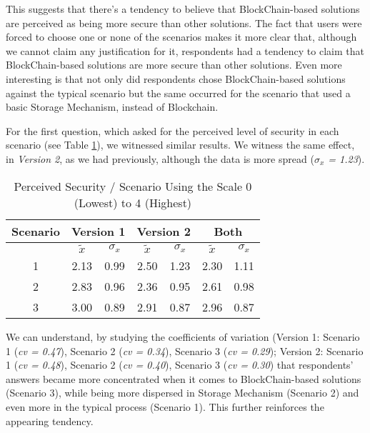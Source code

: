 This suggests that there's a tendency to believe that BlockChain-based solutions are perceived as being more secure than other solutions. The fact that users were forced to choose one or none of the scenarios makes it more clear that, although we cannot claim any justification for it, respondents had a tendency to claim that BlockChain-based solutions are more secure than other solutions. Even more interesting is that not only did respondents chose BlockChain-based solutions against the typical scenario but the same occurred for the scenario that used a basic Storage Mechanism, instead of Blockchain.

For the first question, which asked for the perceived level of security in each scenario (see Table \ref{tab: perceivedSecurity}), we witnessed similar results. We witness the same effect, in \textit{Version 2}, as we had previously, although the data is more spread (\textit{$\sigma_{x}$ = 1.23}).

\begin{table}[htb]
    \centering
    \caption{Perceived Security / Scenario Using the Scale 0 (Lowest) to 4 (Highest)}
    \label{tab: perceivedSecurity}
    \begin{tabular}{c|cccc|cc}
    \hline 
    Scenario & \multicolumn{2}{c}{\bf Version 1} & \multicolumn{2}{c}{\bf Version 2} \vrule & \multicolumn{2}{c}{\bf Both} \\
    \hline
     & $\tilde{x}$ & $\sigma_{x}$ & $\tilde{x}$ & $\sigma_{x}$ & $\tilde{x}$ & $\sigma_{x}$ \\
    \hline
    1 & 2.13 & 0.99 & 2.50 & 1.23 & 2.30 & 1.11 \\
    2 & 2.83 & 0.96 & 2.36 & 0.95 & 2.61 & 0.98 \\
    3 & 3.00 & 0.89 & 2.91 & 0.87 & 2.96 & 0.87 \\
    \hline
    \end{tabular}
\end{table}

We can understand, by studying the coefficients of variation (Version 1: Scenario 1 (\textit{cv = 0.47}), Scenario 2 (\textit{cv = 0.34}), Scenario 3 (\textit{cv = 0.29}); Version 2: Scenario 1 (\textit{cv = 0.48}), Scenario 2 (\textit{cv = 0.40}), Scenario 3 (\textit{cv = 0.30}) that respondents' answers became more concentrated when it comes to BlockChain-based solutions (Scenario 3), while being more dispersed in Storage Mechanism (Scenario 2) and even more in the typical process (Scenario 1). This further reinforces the appearing tendency.

